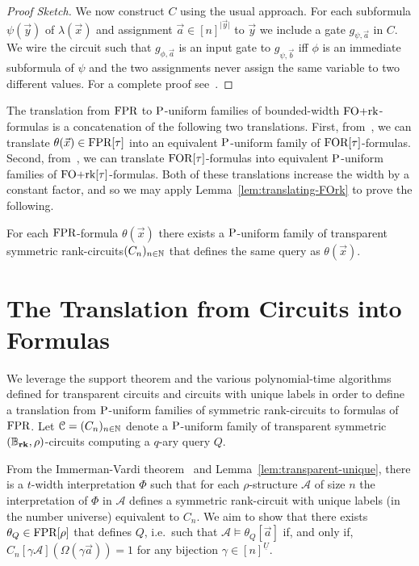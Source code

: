 \documentclass[a4paper,UKenglish]{lipics-v2018}
\begin{document}
\begin{proof}[Proof Sketch]
  We now construct $C$ using the usual approach. For each subformula
  $\psi(\vec{y})$ of $\lambda(\vec{x})$ and assignment $\vec{a} \in [n]^{\vert
    \vec{y} \vert}$ to $\vec{y}$ we include a gate $g_{\psi, \vec{a}}$ in $C$.
  We wire the circuit such that $g_{\phi, \vec{a}}$ is an input gate to
  $g_{\psi, \vec{b}}$ iff $\phi$ is an immediate subformula of $\psi$ and the
  two assignments never assign the same variable to two different values. For a
  complete proof see~\cite{DW-arxiv}.
\end{proof}

The translation from $\text{\upshape FPR}$ to $\mathrm{P}$-uniform families of bounded-width
$\text{\upshape FO+rk}$-formulas is a concatenation of the following two translations. First,
from~\cite{Dawar09logicswith}, we can translate $\theta(\vec{x}) \in \text{\upshape FPR}[\tau]$
into an equivalent $\mathrm{P}$-uniform family of $\text{\upshape FOR}[\tau]$-formulas. Second,
from~\cite{libkin2004elements}, we can translate $\text{\upshape FOR}[\tau]$-formulas into
equivalent $\mathrm{P}$-uniform families of $\text{\upshape FO+rk}[\tau]$-formulas. Both of these
translations increase the width by a constant factor, and so we may apply
Lemma~\ref{lem:translating-FOrk} to prove the following.

\begin{theorem}
  For each $\text{\upshape FPR}$-formula $\theta(\vec{x})$ there exists a $\mathrm{P}$-uniform family
  of transparent symmetric rank-circuits$(C_n)_{n \in \mathbb{N}}$ that defines the
  same query as $\theta(\vec{x})$.
  \label{thm:translating-formulas-to-circuits}
\end{theorem}

\section{The Translation from Circuits into
  Formulas}\label{sec:circuits-to-formulas}
We leverage the support theorem and the various polynomial-time algorithms
defined for transparent circuits and circuits with unique labels in order to
define a translation from $\mathrm{P}$-uniform families of symmetric rank-circuits to
formulas of $\text{\upshape FPR}$. Let $\mathcal{C} = (C_n)_{n \in \mathbb{N}}$ denote a
$\mathrm{P}$-uniform family of transparent symmetric $(\mathbb{B}_{\text{\textbf{rk}}}, \rho)$-circuits computing a
$q$-ary query $Q$.

From the Immerman-Vardi theorem~\cite{Immerman198686, Vardi:1982} and
Lemma~\ref{lem:transparent-unique}, there is a $t$-width interpretation $\Phi$
such that for each $\rho$-structure $\mathcal{A}$ of size $n$ the interpretation
of $\Phi$ in $\mathcal{A}$ defines a symmetric rank-circuit with unique labels
(in the number universe) equivalent to $C_n$. We aim to show that there exists
$\theta_Q \in \text{\upshape FPR}[\rho]$ that defines $Q$, i.e.\ such that $\mathcal{A} \models
\theta_Q[\vec{a}]$ if, and only if, $C_n[\gamma \mathcal{A}](\Omega (\gamma
\vec{a})) = 1$ for any bijection $\gamma \in [n]^{\underline{U}}$.
\end{document}
